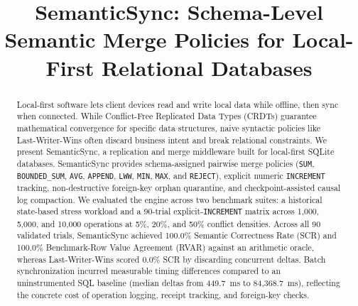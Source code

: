 \documentclass[conference]{IEEEtran}
\begin{document}
\title{SemanticSync: Schema-Level Semantic Merge Policies for Local-First Relational Databases}

\author{
\and
{}
}

\maketitle

\begin{abstract}
Local-first software lets client devices read and write local data while offline, then sync when connected. While Conflict-Free Replicated Data Types (CRDTs) guarantee mathematical convergence for specific data structures, naive syntactic policies like Last-Writer-Wins often discard business intent and break relational constraints. We present SemanticSync, a replication and merge middleware built for local-first SQLite databases. SemanticSync provides schema-assigned pairwise merge policies (\texttt{SUM}, \texttt{BOUNDED\_SUM}, \texttt{AVG}, \texttt{APPEND}, \texttt{LWW}, \texttt{MIN}, \texttt{MAX}, and \texttt{REJECT}), explicit numeric \texttt{INCREMENT} tracking, non-destructive foreign-key orphan quarantine, and checkpoint-assisted causal log compaction. We evaluated the engine across two benchmark suites: a historical state-based stress workload and a 90-trial explicit-\texttt{INCREMENT} matrix across 1,000, 5,000, and 10,000 operations at 5\%, 20\%, and 50\% conflict densities. Across all 90 validated trials, SemanticSync achieved 100.0\% Semantic Correctness Rate (SCR) and 100.0\% Benchmark-Row Value Agreement (RVAR) against an arithmetic oracle, whereas Last-Writer-Wins scored 0.0\% SCR by discarding concurrent deltas. Batch synchronization incurred measurable timing differences compared to an uninstrumented SQL baseline (median deltas from 449.7~ms to 84,368.7~ms), reflecting the concrete cost of operation logging, receipt tracking, and foreign-key checks.
\end{abstract}
\end{document}
